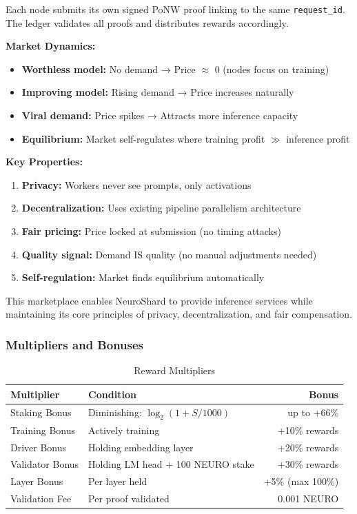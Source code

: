 \documentclass[11pt,a4paper]{article}
\begin{document}
Each node submits its own signed PoNW proof linking to the same \texttt{request\_id}. The ledger validates all proofs and distributes rewards accordingly.

\textbf{Market Dynamics:}
\begin{itemize}
    \item \textbf{Worthless model:} No demand → Price $\approx$ 0 (nodes focus on training)
    \item \textbf{Improving model:} Rising demand → Price increases naturally
    \item \textbf{Viral demand:} Price spikes → Attracts more inference capacity
    \item \textbf{Equilibrium:} Market self-regulates where training profit $\gg$ inference profit
\end{itemize}

\textbf{Key Properties:}
\begin{enumerate}
    \item \textbf{Privacy:} Workers never see prompts, only activations
    \item \textbf{Decentralization:} Uses existing pipeline parallelism architecture
    \item \textbf{Fair pricing:} Price locked at submission (no timing attacks)
    \item \textbf{Quality signal:} Demand IS quality (no manual adjustments needed)
    \item \textbf{Self-regulation:} Market finds equilibrium automatically
\end{enumerate}

This marketplace enables NeuroShard to provide inference services while maintaining its core principles of privacy, decentralization, and fair compensation.

\subsubsection{Multipliers and Bonuses}
\begin{table}[H]
\centering
\caption{Reward Multipliers}
\begin{tabular}{@{}llr@{}}
\toprule
\textbf{Multiplier} & \textbf{Condition} & \textbf{Bonus} \\
\midrule
Staking Bonus & Diminishing: $\log_2(1 + S/1000)$ & up to +66\% \\
Training Bonus & Actively training & +10\% rewards \\
Driver Bonus & Holding embedding layer & +20\% rewards \\
Validator Bonus & Holding LM head + 100 NEURO stake & +30\% rewards \\
Layer Bonus & Per layer held & +5\% (max 100\%) \\
Validation Fee & Per proof validated & 0.001 NEURO \\
\bottomrule
\end{tabular}
\end{table}
\end{document}
